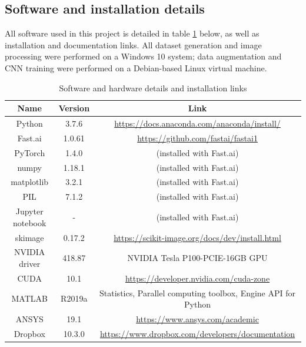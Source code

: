 \documentclass[11pt,letterpaper]{article}
\begin{document}
		\subsection{Software and installation details}
		All software used in this project is detailed in table \ref{table:software} below, as well as installation and documentation links. All dataset generation and image processing were performed on a Windows 10 system; data augmentation and CNN training were performed on a Debian-based Linux virtual machine.
		\begin{table}[H]
		\centering
		\captionsetup{margin=1cm}
		\caption{Software and hardware details and installation links}
		\renewcommand{\arraystretch}{1.5}
		\begin{tabular}{| c | c | c |}
		\hline
	 	\textbf{Name} & \textbf{Version} & \textbf{Link} \\ \hline \hline
	 	Python & 3.7.6 & \url{https://docs.anaconda.com/anaconda/install/}\\ \hline
		Fast.ai & 1.0.61 & \url{https://github.com/fastai/fastai1} \\ \hline
		PyTorch & 1.4.0 & (installed with Fast.ai)\\ \hline
		numpy & 1.18.1 & (installed with Fast.ai)\\ \hline
		matplotlib & 3.2.1 & (installed with Fast.ai)\\ \hline
		PIL & 7.1.2 &(installed with Fast.ai) \\ \hline
		Jupyter notebook & - & (installed with Fast.ai)\\ \hline
		skimage & 0.17.2 & \url{https://scikit-image.org/docs/dev/install.html}\\ \hline
		NVIDIA driver & 418.87 & NVIDIA Tesla P100-PCIE-16GB GPU\\ \hline
		CUDA & 10.1 & \url{https://developer.nvidia.com/cuda-zone} \\ \hline
		MATLAB & R2019a & Statistics, Parallel computing toolbox, Engine API for Python \\ \hline
		ANSYS & 19.1 & \url{https://www.ansys.com/academic}\\ \hline
		Dropbox & 10.3.0 & \url{https://www.dropbox.com/developers/documentation} \\ \hline
		\end{tabular}\\
		\label{table:software}
		\end{table}
\end{document}
